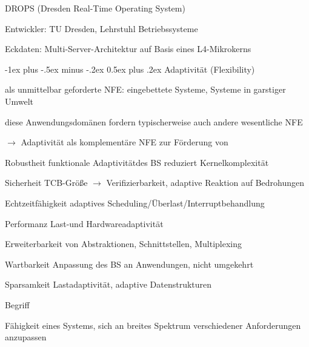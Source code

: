 \documentclass[a4paper]{article}
\makeatletter
\renewcommand{\section}{\@startsection{section}{1}{0mm}%
 {-1ex plus -.5ex minus -.2ex}%
 {0.5ex plus .2ex}%
 {\normalfont\large\bfseries}}
\makeatother
\begin{document}
\begin{multicols}{3}
    DROPS (Dresden Real-Time Operating System)
    \begin{itemize*}
        \item Entwickler: TU Dresden, Lehrstuhl Betriebssysteme
        \item Eckdaten: Multi-Server-Architektur auf Basis eines L4-Mikrokerns
    \end{itemize*}

    \pagebreak
    \section{Adaptivität (Flexibility)}
    \begin{itemize*}
        \item als unmittelbar geforderte NFE: eingebettete Systeme, Systeme in garstiger Umwelt
        \item diese Anwendungsdomänen fordern typischerweise auch andere wesentliche NFE
        \item[$\rightarrow$] Adaptivität als komplementäre NFE zur Förderung von
    \end{itemize*}
    \begin{description*}
        \item[Robustheit] funktionale Adaptivitätdes BS reduziert Kernelkomplexität %
        \item[Sicherheit] TCB-Größe $\rightarrow$ Verifizierbarkeit, adaptive Reaktion auf Bedrohungen
        \item[Echtzeitfähigkeit] adaptives Scheduling/Überlast/Interruptbehandlung
        \item[Performanz] Last-und Hardwareadaptivität
        \item[Erweiterbarkeit] von Abstraktionen, Schnittstellen, Multiplexing
        \item[Wartbarkeit] Anpassung des BS an Anwendungen, nicht umgekehrt
        \item[Sparsamkeit] Lastadaptivität, adaptive Datenstrukturen
    \end{description*}
    \begin{itemize*}
        \item Begriff
        \begin{itemize*}
            \item Fähigkeit eines Systems, sich an breites Spektrum verschiedener Anforderungen anzupassen

\end{itemize*}
\end{itemize*}
\end{multicols}
\end{document}
